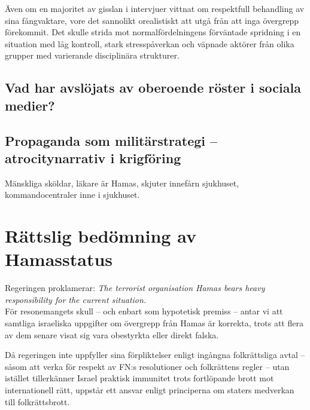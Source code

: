 Även om en majoritet av gisslan i intervjuer vittnat om respektfull behandling av sina fångvaktare, vore det sannolikt orealistiskt att utgå från att inga övergrepp förekommit. Det skulle strida mot normalfördelningens förväntade spridning i en situation med låg kontroll, stark stresspåverkan och väpnade aktörer från olika grupper med varierande disciplinära strukturer.


\subsection*{Vad har avslöjats av oberoende röster i sociala medier?}

\subsection*{Propaganda som militärstrategi – atrocitynarrativ i krigföring}

Mänskliga sköldar, läkare är Hamas, skjuter innefårn sjukhuset, kommandocentraler inne i sjukhuset.



\section{Rättslig bedömning av Hamasstatus}

Regeringen proklamerar:
\textit{The terrorist organisation Hamas bears heavy responsibility for the current situation. }\\

För resonemangets skull – och enbart som hypotetisk premiss – antar vi att samtliga israeliska uppgifter om övergrepp från Hamas är korrekta, trots att flera av dem senare visat sig vara obestyrkta eller direkt falska.


Då regeringen inte uppfyller sina förpliktelser enligt ingångna folkrättsliga avtal – såsom att verka för respekt av FN:s resolutioner och folkrättens regler – utan istället tillerkänner Israel praktisk immunitet trots fortlöpande brott mot internationell rätt, uppstår ett ansvar enligt principerna om staters medverkan till folkrättsbrott.

